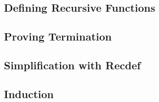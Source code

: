 \subsection{Defining Recursive Functions}
\label{sec:recdef-examples}


\subsection{Proving Termination}



\subsection{Simplification with Recdef}
\label{sec:recdef-simplification}



\subsection{Induction}


\label{sec:recdef-induction}

